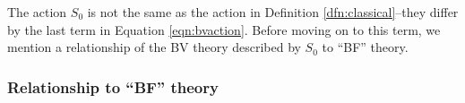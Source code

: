 \documentclass[11pt]{amsart}
\def\PV{{\rm PV}}
\begin{document}
The action $S_0$ is not the same as the action in Definition \ref{dfn:classical}--they differ by the last term in Equation \eqref{eqn:bvaction}. 
Before moving on to this term, we mention a relationship of the BV theory described by $S_0$ to ``BF'' theory.




\subsubsection{Relationship to ``BF'' theory}
\end{document}
